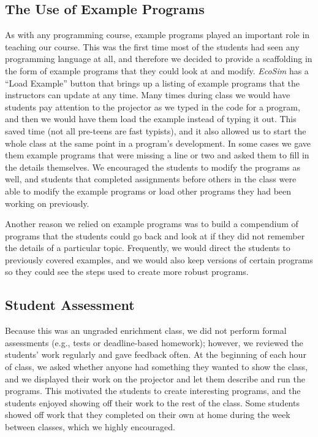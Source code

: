 \documentclass{sig-alternate}
\begin{document}
\subsection{The Use of Example Programs}
As with any programming course, example programs played an important role in teaching our course.
This was the first time most of the students had seen any programming language at all, and
therefore we decided to provide a scaffolding in the form of example programs that they could
look at and modify.  \emph{EcoSim} has a ``Load Example'' button that brings up a listing of
example programs that the instructors can update at any time.  Many times during class we would
have students pay attention to the projector as we typed in the code for a program, and then we
would have them load the example instead of typing it out.  This saved time (not all pre-teens
are fast typists), and it also allowed us to start the whole class at the same point in a program's
development.  In some cases we gave them example programs that were missing a line or two and
asked them to fill in the details themselves.  We encouraged the students to modify the programs
as well, and students that completed assignments before others in the class were able to modify
the example programs or load other programs they had been working on previously.

Another reason we relied on example programs was to build a compendium of programs that the students
could go back and look at if they did not remember the details of a particular topic.  Frequently,
we would direct the students to previously covered examples, and we would also keep versions of 
certain programs so they could see the steps used to create more robust programs.

\subsection{Student Assessment}
Because this was an ungraded enrichment class, we did not perform formal assessments (e.g., tests
or deadline-based homework); however, we reviewed the students' work regularly and gave feedback
often.  At the beginning of each hour of class, we asked whether anyone had something they wanted
to show the class, and we displayed their work on the projector and let them describe and run the
programs.  This motivated the students to create interesting programs, and the students enjoyed
showing off their work to the rest of the class.  Some students showed off work that they completed
on their own at home during the week between classes, which we highly encouraged.
\end{document}
